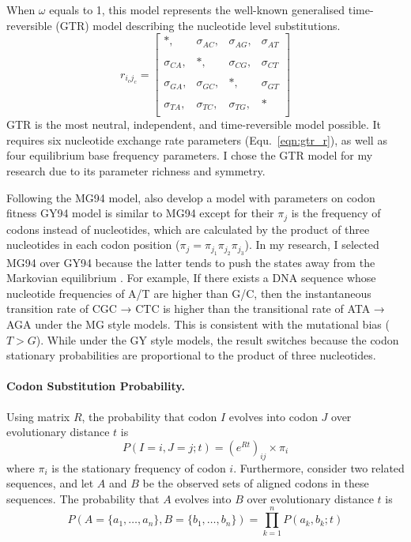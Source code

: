  When $\omega$ equals to 1, this model represents the well-known generalised time-reversible (GTR) model \parencite{tavare1986some} describing the nucleotide level substitutions.
\begin{equation}
\label{eqn:gtr_r}
r_{{i_c} {j_c}} = \begin{bmatrix}
            *,&      \sigma_{AC},&  \sigma_{AG},&  \sigma_{AT} \\\\
            \sigma_{CA},&  *,&       \sigma_{CG},&  \sigma_{CT} \\\\
            \sigma_{GA},&  \sigma_{GC},& *,&       \sigma_{GT} \\\\
            \sigma_{TA},&  \sigma_{TC},&  \sigma_{TG},&  * \\
          \end{bmatrix}
\end{equation}
GTR is the most neutral, independent, and time-reversible model possible. It requires six nucleotide exchange rate parameters (Equ.\ \ref{eqn:gtr_r}), as well as four equilibrium base frequency parameters. I chose the GTR model for my research due to its parameter richness and symmetry.


Following the MG94 model, \cite{goldman1994codon} also develop a model with parameters on codon fitness GY94 model is similar to MG94 except for their $\pi_j$ is the frequency of codons instead of nucleotides, which are calculated by the product of three nucleotides in each codon position ($\pi_j = \pi_{j_1}\pi_{j_2}\pi_{j_3}$). In my research, I selected MG94 over GY94 because the latter tends to push the states away from the Markovian equilibrium \parencite{rodrigue2008bayesian}. For example, If there exists a DNA sequence whose nucleotide frequencies of A/T are higher than G/C, then the instantaneous transition rate of CGC → CTC is higher than the transitional rate of ATA → AGA under the MG style models. This is consistent with the mutational bias ($T>G$). While under the GY style models, the result switches because the codon stationary probabilities are proportional to the product of three nucleotides.

\paragraph{Codon Substitution Probability.} Using matrix $R$, the probability that codon $I$ evolves into codon $J$ over evolutionary distance $t$ is
%
\begin{equation} 
P\left(I = i, J = j ; t \right) = \left(e^{Rt}\right)_{ij} \times \pi_{i} 
\end{equation}
%
where $\pi_i$ is the stationary frequency of codon $i$. Furthermore, consider two related sequences, and let $A$ and $B$ be the observed sets of aligned codons in these sequences. The probability that $A$ evolves into $B$ over evolutionary distance $t$ is
%
\begin{equation}
    P\left(A = \{a_1, \ldots, a_n \}, B = \{b_1, \ldots, b_n \} \right) = \prod_{k=1}^{n} P(a_k, b_k ; t) 
\end{equation}
%


